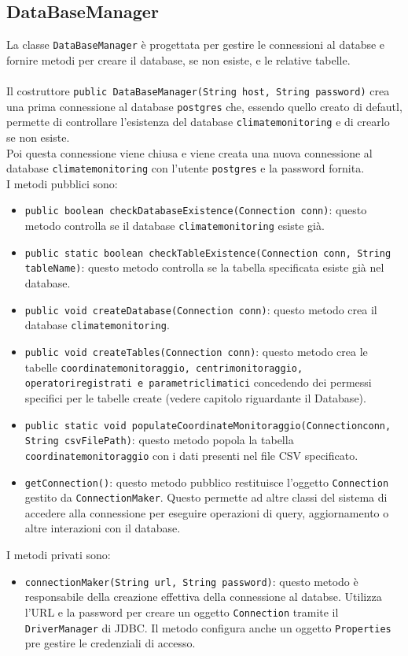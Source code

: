 \subsection{DataBaseManager}
La classe \texttt{DataBaseManager} è progettata per gestire le connessioni al databse e fornire metodi per creare il database, se non esiste, e le relative tabelle.\\
\\
Il costruttore \texttt{public DataBaseManager(String host, String password)} crea una prima connessione al database \texttt{postgres} che, essendo quello creato di defautl,
permette di controllare l'esistenza del database \texttt{climatemonitoring} e di crearlo se non esiste.\\
Poi questa connessione viene chiusa e viene creata una nuova connessione al database \texttt{climatemonitoring} con l'utente \texttt{postgres} e la password fornita.\\
I metodi pubblici sono:
\begin{itemize}
      \item \texttt{public boolean checkDatabaseExistence(Connection conn)}: questo metodo controlla se il database \texttt{climatemonitoring} esiste già.
      \item  \texttt{public static boolean checkTableExistence(Connection conn, String tableName)}: questo metodo controlla se la tabella specificata esiste già nel database.
      \item \texttt{public void createDatabase(Connection conn)}: questo metodo crea il database \texttt{climatemonitoring}.
      \item \texttt{public void createTables(Connection conn)}: questo metodo crea le tabelle \texttt{coordinatemonitoraggio, centrimonitoraggio, operatoriregistrati e parametriclimatici}
      concedendo dei permessi specifici per le tabelle create (vedere capitolo riguardante il Database).
      \item \texttt{public static void populateCoordinateMonitoraggio(Connectionconn, String csvFilePath)}: questo metodo popola la tabella \texttt{coordinatemonitoraggio} con i dati presenti nel file CSV specificato.
      \item \texttt{getConnection()}:
            questo metodo pubblico restituisce l'oggetto \texttt{Connection} gestito da \texttt{ConnectionMaker}. Questo permette ad altre classi del sistema di accedere alla connessione per eseguire operazioni di query, aggiornamento o altre interazioni con il database.
\end{itemize}
I metodi privati sono:
\begin{itemize}
      \item \texttt{connectionMaker(String url, String password)}:
            questo metodo è responsabile della creazione effettiva della connessione al databse. Utilizza l'URL e la password per creare un oggetto \texttt{Connection} tramite il \texttt{DriverManager} di JDBC. Il metodo configura anche un oggetto \texttt{Properties} pre gestire le credenziali di accesso.
\end{itemize}


